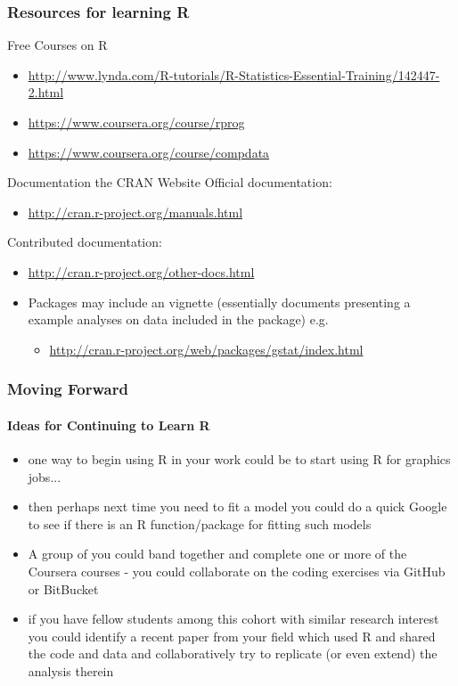 \documentclass[xcolor=dvipsnames]{beamer}
\begin{document}
\begin{frame}
\frametitle{Resources for learning R}

\begin{block}{Free Courses on R}
\begin{itemize}
\item \small \url{http://www.lynda.com/R-tutorials/R-Statistics-Essential-Training/142447-2.html}
\item \small \url{https://www.coursera.org/course/rprog}
\item \small \url{https://www.coursera.org/course/compdata}
\end{itemize}
\end{block}

\begin{block}{Documentation the CRAN Website}
Official documentation: \begin{itemize}
\item \small \url{http://cran.r-project.org/manuals.html}
\end{itemize}

Contributed documentation: \begin{itemize}
\item \small \url{http://cran.r-project.org/other-docs.html} \end{itemize}
\begin{itemize}
\item Packages may include an vignette (essentially documents presenting a example analyses on data included in the package) e.g. \begin{itemize}
 \item \small \url{http://cran.r-project.org/web/packages/gstat/index.html} \end{itemize}
\end{itemize}
\end{block}

\end{frame}

\begin{frame}
\frametitle{Moving Forward}
\framesubtitle{Ideas for Continuing to Learn R}

\begin{itemize}
\item one way to begin using R in your work could be to start using R for graphics jobs...
\newline
\item then perhaps next time you need to fit a model you could do a quick Google to see if there is an R function/package for fitting such models
\newline
\item A group of you could band together and complete one or more of the Coursera courses - you could collaborate on the coding exercises via GitHub or BitBucket
\newline
\item if you have fellow students among this cohort with similar research interest you could identify a recent paper from your field which used R and shared the code and data and collaboratively try to replicate (or even extend) the analysis therein
\end{itemize}

\end{frame}
\end{document}
